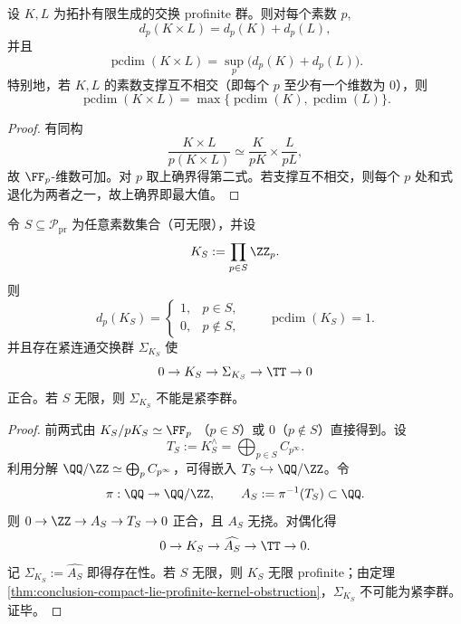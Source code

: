 \begin{proposition}[素数并行的最大值法则与非加性]\label{prop:conclusion-pcdim-max-law}
设 \(K,L\) 为拓扑有限生成的交换 profinite 群。则对每个素数 \(p\),
\[
d_p(K\times L)=d_p(K)+d_p(L),
\]
并且
\[
\operatorname{pcdim}(K\times L)
=
\sup_p\bigl(d_p(K)+d_p(L)\bigr).
\]
特别地，若 \(K,L\) 的素数支撑互不相交（即每个 \(p\) 至少有一个维数为 \(0\)），则
\[
\operatorname{pcdim}(K\times L)=
\max\{\operatorname{pcdim}(K),\operatorname{pcdim}(L)\}.
\]
\end{proposition}
\begin{proof}
有同构
\[
\frac{K\times L}{p(K\times L)}
\simeq
\frac{K}{pK}\times \frac{L}{pL},
\]
故 \(\FF_p\)-维数可加。对 \(p\) 取上确界得第二式。若支撑互不相交，则每个 \(p\) 处和式退化为两者之一，故上确界即最大值。
\end{proof}



\begin{corollary}[无限素数族的一圆维内化]\label{cor:conclusion-infinite-primes-one-circle}
令 \(S\subseteq \mathcal P_{\mathrm{pr}}\) 为任意素数集合（可无限），并设
\[
K_S:=\prod_{p\in S}\ZZ_p.
\]
则
\[
d_p(K_S)=
\begin{cases}
1,&p\in S,\\
0,&p\notin S,
\end{cases}
\qquad
\operatorname{pcdim}(K_S)=1.
\]
并且存在紧连通交换群 \(\Sigma_{K_S}\) 使
\[
0\to K_S\to \Sigma_{K_S}\to \TT\to 0
\]
正合。若 \(S\) 无限，则 \(\Sigma_{K_S}\) 不能是紧李群。
\end{corollary}
\begin{proof}
前两式由
\(
K_S/pK_S\simeq \FF_p
\)
（\(p\in S\)）或 \(0\)（\(p\notin S\)）直接得到。设
\[
T_S:=K_S^\wedge=\bigoplus_{p\in S}C_{p^\infty}.
\]
利用分解 \(\QQ/\ZZ\simeq\bigoplus_p C_{p^\infty}\)，可得嵌入 \(T_S\hookrightarrow \QQ/\ZZ\)。令
\[
\pi:\QQ\twoheadrightarrow \QQ/\ZZ,\qquad
A_S:=\pi^{-1}(T_S)\subset\QQ.
\]
则 \(0\to \ZZ\to A_S\to T_S\to 0\) 正合，且 \(A_S\) 无挠。对偶化得
\[
0\to K_S\to \widehat{A_S}\to \TT\to 0.
\]
记 \(\Sigma_{K_S}:=\widehat{A_S}\) 即得存在性。若 \(S\) 无限，则 \(K_S\) 无限 profinite；由定理 \ref{thm:conclusion-compact-lie-profinite-kernel-obstruction}，\(\Sigma_{K_S}\) 不可能为紧李群。证毕。
\end{proof}



